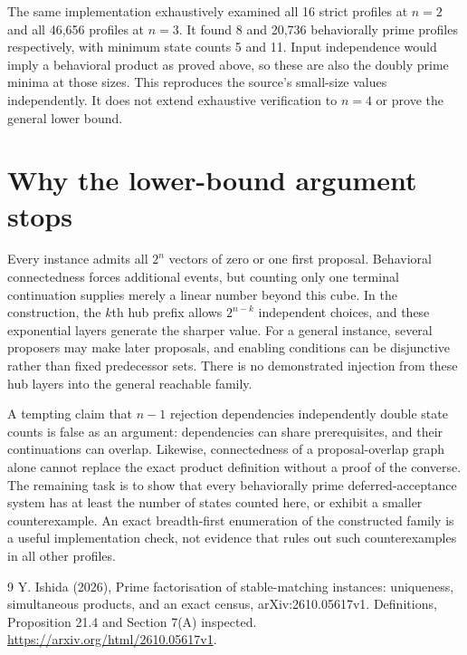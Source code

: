 \documentclass[11pt]{article}
\begin{document}
The same implementation exhaustively examined all 16 strict profiles at $n=2$ and all 46,656 profiles at $n=3$. It found 8 and 20,736 behaviorally prime profiles respectively, with minimum state counts 5 and 11. Input independence would imply a behavioral product as proved above, so these are also the doubly prime minima at those sizes. This reproduces the source's small-size values independently. It does not extend exhaustive verification to $n=4$ or prove the general lower bound.

\section*{Why the lower-bound argument stops}
Every instance admits all $2^n$ vectors of zero or one first proposal. Behavioral connectedness forces additional events, but counting only one terminal continuation supplies merely a linear number beyond this cube. In the construction, the $k$th hub prefix allows $2^{n-k}$ independent choices, and these exponential layers generate the sharper value. For a general instance, several proposers may make later proposals, and enabling conditions can be disjunctive rather than fixed predecessor sets. There is no demonstrated injection from these hub layers into the general reachable family.

A tempting claim that $n-1$ rejection dependencies independently double state counts is false as an argument: dependencies can share prerequisites, and their continuations can overlap. Likewise, connectedness of a proposal-overlap graph alone cannot replace the exact product definition without a proof of the converse. The remaining task is to show that every behaviorally prime deferred-acceptance system has at least the number of states counted here, or exhibit a smaller counterexample. An exact breadth-first enumeration of the constructed family is a useful implementation check, not evidence that rules out such counterexamples in all other profiles.

\begin{thebibliography}{9}
 Y. Ishida (2026), Prime factorisation of stable-matching instances: uniqueness, simultaneous products, and an exact census, arXiv:2610.05617v1. Definitions, Proposition 21.4 and Section 7(A) inspected. \url{https://arxiv.org/html/2610.05617v1}.
\end{thebibliography}
\end{document}

